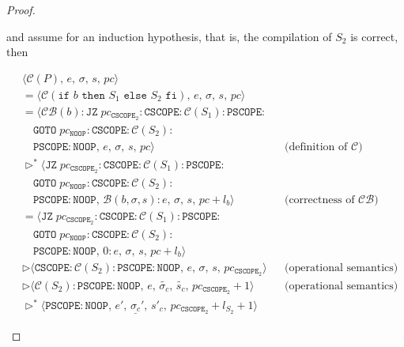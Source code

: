 \documentclass{article}
\begin{document}
\begin{proof}
\begin{itemize}
\begin{itemize}
            and assume for an induction hypothesis, that is, the compilation of $S_2$ is correct, then

            \[
              \begin{aligned}
              &\langle \mathcal{C}(P),\, e,\, \sigma,\, s,\, pc \rangle \\
              &= \langle \mathcal{C}(\texttt{if } b \texttt{ then } S_1 \texttt{ else } S_2 \texttt{ fi}),\, e,\, \sigma,\, s,\, pc \rangle \\
              &= \langle \mathcal{CB}(b) : \texttt{JZ}\; pc_{\texttt{CSCOPE}_2} : \texttt{CSCOPE} : \mathcal{C}(S_1) : \texttt{PSCOPE} : \\
              &\quad \texttt{GOTO}\; pc_{\texttt{NOOP}} : \texttt{CSCOPE} : \mathcal{C}(S_2) : \\
              &\quad \texttt{PSCOPE} : \texttt{NOOP} ,\, e,\, \sigma,\, s,\, pc \rangle
              && \text{(definition of } \mathcal{C}\text{)} \\
              &\triangleright^\ast \langle \texttt{JZ}\; pc_{\texttt{CSCOPE}_2} : \texttt{CSCOPE} : \mathcal{C}(S_1) : \texttt{PSCOPE} : \\
              &\quad \texttt{GOTO}\; pc_{\texttt{NOOP}} : \texttt{CSCOPE} : \mathcal{C}(S_2) : \\
              &\quad \texttt{PSCOPE} : \texttt{NOOP} ,\, \mathcal{B}(b, \sigma, s) : e,\, \sigma,\, s,\, pc + l_b \rangle
              && \text{(correctness of } \mathcal{CB}\text{)} \\
              &= \langle \texttt{JZ}\; pc_{\texttt{CSCOPE}_2} : \texttt{CSCOPE} : \mathcal{C}(S_1) : \texttt{PSCOPE} : \\
              &\quad \texttt{GOTO}\; pc_{\texttt{NOOP}} : \texttt{CSCOPE} : \mathcal{C}(S_2) : \\
              &\quad \texttt{PSCOPE} : \texttt{NOOP},\, 0 : e,\, \sigma,\, s,\, pc + l_b \rangle \\
              &\triangleright \langle \texttt{CSCOPE} : \mathcal{C}(S_2) : \texttt{PSCOPE} : \texttt{NOOP},\, e,\, \sigma,\, s,\, pc_{\texttt{CSCOPE}_2} \rangle
              && \text{(operational semantics)} \\
              &\triangleright \langle \mathcal{C}(S_2) : \texttt{PSCOPE} : \texttt{NOOP},\, e,\, \tilde{\sigma_c},\, \tilde{s_c},\, pc_{\texttt{CSCOPE}_2} + 1\rangle
              && \text{(operational semantics)} \\
              &\triangleright^\ast \langle \texttt{PSCOPE} : \texttt{NOOP},\, e',\, \underline{\sigma_c}' ,\, s'_c,\, pc_{\texttt{CSCOPE}_2} + l_{S_2} + 1 \rangle

\end{aligned}\]
\end{itemize}
\end{itemize}
\end{proof}
\end{document}
